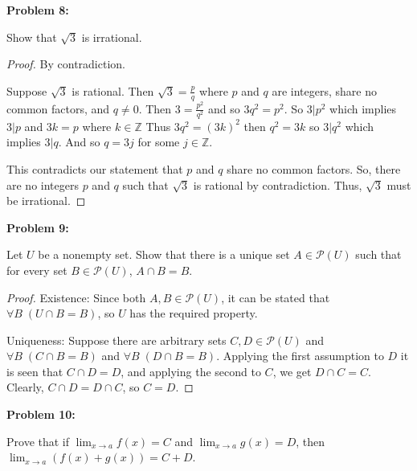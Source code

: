 \documentclass{article}
\begin{document}

    \textbf{Problem 8:}

    Show that $\sqrt{3}$ is irrational.

    \begin{proof}
        By contradiction. 
        
        Suppose $\sqrt{3}$ is rational. Then $\sqrt{3} = \frac{p}{q}$
        where $p$ and $q$ are integers, share no common factors, and $q\neq 0$. Then
        $3=\frac{p^2}{q^2}$ and so $3q^2=p^2$. So $3|p^2$ which implies $3|p$ and $3k=p$
        where $k \in\mathbb{Z}$ Thus $3q^2=(3k)^2$ then $q^2=3k$ so $3|q^2$ which implies
        $3|q$. And so $q=3j$ for some $j\in\mathbb{Z}$. 
        
        This contradicts our statement that $p$ and $q$ share no common factors. So, there 
        are no integers $p$ and $q$ such that $\sqrt{3}$ is rational by contradiction. Thus,
        $\sqrt{3}$ must be irrational.
    \end{proof}


    \textbf{Problem 9:}

    Let $U$ be a nonempty set. Show that there is a unique set $A \in \mathcal{P}(U)$ such
    that for every set $B \in\mathcal{P}(U)$, $A \cap B = B$.

    \begin{proof}
        Existence: Since both $A,B\in\mathcal{P}(U)$, it can be stated that 
        $\forall B\; (U\cap B=B)$, so $U$ has the required property. 

        Uniqueness: Suppose there are arbitrary sets $C,D\in\mathcal{P}(U)$ and $\forall B\; (C\cap B=B)$
        and  $\forall B\; (D\cap B=B)$. Applying the first assumption to $D$ it is seen that
        $C\cap D = D$, and applying the second to $C$, we get $D\cap C = C$. Clearly,
        $C\cap D = D\cap C$, so $C=D$.
    \end{proof}


    \textbf{Problem 10:}

    Prove that if 
    $\lim_{x\rightarrow a} f(x) = C$ and $\lim_{x\rightarrow a} g(x) = D$, then 
    $\lim_{x\rightarrow a}(f(x)+g(x)) = C + D$.
\end{document}
